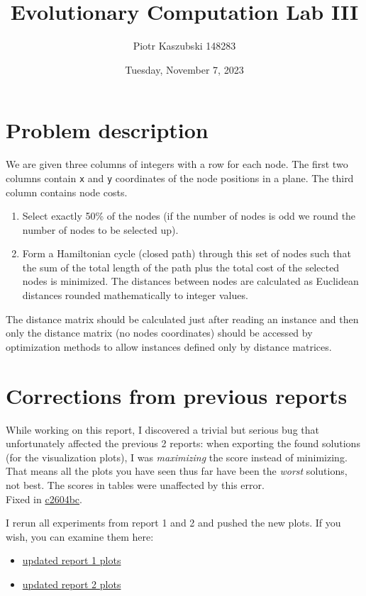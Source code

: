 \documentclass[14pt]{article}
\title{Evolutionary Computation Lab III}
\author{Piotr Kaszubski 148283}
\date{Tuesday, November  7, 2023}
\begin{document}
\maketitle
\tableofcontents
\newpage

\section{Problem description}
We are given three columns of integers with a row for each node. The first two
columns contain \verb`x` and \verb`y` coordinates of the node positions in a
plane. The third column contains node costs.

\begin{enumerate}
	\item Select exactly 50\% of the nodes (if the number of nodes is odd we
		round the number of nodes to be selected up).
	\item Form a Hamiltonian cycle (closed path) through this set of nodes such
		that the sum of the total length of the path plus the total cost of the
		selected nodes is minimized. The distances between nodes are calculated
		as Euclidean distances rounded mathematically to integer values.
\end{enumerate}

The distance matrix should be calculated just after reading an instance and
then only the distance matrix (no nodes coordinates) should be accessed by
optimization methods to allow instances defined only by distance matrices.

\section{Corrections from previous reports}
While working on this report, I discovered a trivial but serious bug that
unfortunately affected the previous 2 reports: when exporting the found
solutions (for the visualization plots), I was \emph{maximizing} the score
instead of minimizing. That means all the plots you have seen thus far have
been the \emph{worst} solutions, not best. The scores in tables were unaffected
by this error. \\
Fixed in \href{https://github.com/RoyalDonkey/put-ec-tasks/commit/c2604bc7d0fa83ca02c61c3e38b789cc1ecae52a}{c2604bc}.

\vspace{4mm}
\noindent
I rerun all experiments from report 1 and 2 and pushed the new plots. If you
wish, you can examine them here:
\begin{itemize}
	\item \href{https://github.com/RoyalDonkey/put-ec-tasks/tree/c2604bc7d0fa83ca02c61c3e38b789cc1ecae52a/task1/results}{updated report 1 plots}
	\item \href{https://github.com/RoyalDonkey/put-ec-tasks/tree/c2604bc7d0fa83ca02c61c3e38b789cc1ecae52a/task2/results}{updated report 2 plots}
\end{itemize}
\end{document}
